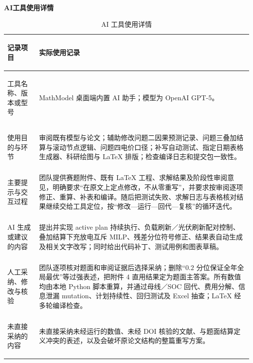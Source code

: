 \documentclass[12pt,a4paper]{ctexart}
\begin{document}
\begin{center}
	{\bfseries AI工具使用详情}
\end{center}

\begin{table}[htbp]
	\centering
	\caption{AI 工具使用详情}
	\begin{tabularx}{\textwidth}{>{\bfseries\raggedright\arraybackslash}p{3.6cm}X}
		\toprule
		记录项目 & 实际使用记录 \\
		\midrule
		工具名称、版本或型号 & MathModel 桌面端内置 AI 助手；模型为 OpenAI GPT-5。 \\
		使用目的与环节 & 审阅既有模型与论文；辅助修改问题二因果预测记录、问题三叠加结算与滚动节点逻辑、问题四电价口径；补写自动测试、指定日期表格生成器、科研绘图与 LaTeX 排版；检查编译日志和提交包一致性。 \\
		主要提示与交互过程 & 团队提供赛题附件、既有 LaTeX 工程、求解结果及阶段性审阅意见，明确要求“在原文上定点修改，不从零重写”，并要求按审阅逐项修正、重算、补表和编译。随后把测试失败、求解日志与表格核对结果继续交给工具定位，按“修改—运行—回代—复核”的循环迭代。 \\
		AI 生成或建议的内容 & 提出并实现 active plan 持续执行、负载刷新／光伏刷新配对控制、叠加结算下充放电互斥 MILP、残差分位符号修正、结果表自动生成及相关文字改写；同时给出代码补丁、测试用例和图表草稿。 \\
		人工采纳、修改与核验 & 团队逐项核对题面和审阅证据后选择采纳；删除“$0.2$ 分位保证全年全局最优”等过强表述，把附件 4 直用结果定为题面主答案。所有数值均由本地 Python 脚本重算，并通过母线／SOC 回代、费用分解、信息泄漏 mutation、计划持续性、回归测试及 Excel 抽查；LaTeX 经多轮编译检查。 \\
		未直接采纳的内容 & 未直接采纳未经运行的数值、未经 DOI 核验的文献、与题面结算定义冲突的表述，以及会破坏原论文结构的整篇重写方案。 \\
		\bottomrule
	\end{tabularx}
\end{table}
\end{document}
